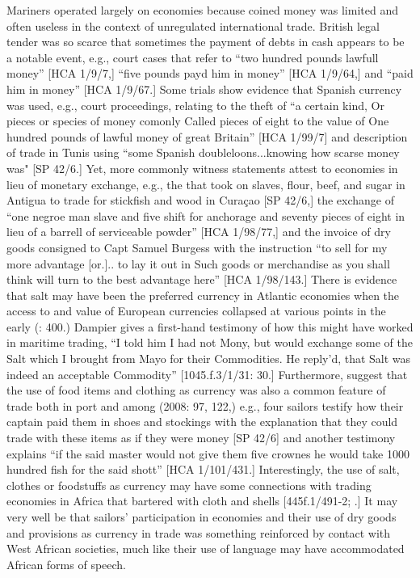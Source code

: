 Mariners operated largely on  economies because coined money was limited and often useless in the context of unregulated international trade. British legal tender was so scarce that sometimes the payment of debts in cash appears to be a notable event, e.g., court cases that refer to “two hundred pounds lawfull money” [HCA 1/9/7,] “five pounds payd him in money” [HCA 1/9/64,] and “paid him in money” [HCA 1/9/67.] Some trials show evidence that Spanish currency was used, e.g., court proceedings, relating to the theft of “a certain kind, Or pieces or species of money comonly Called pieces of eight to the value of One hundred pounds of lawful money of great Britain” [HCA 1/99/7] and description of trade in Tunis using “some Spanish doubleloons...knowing how scarse money was" [SP 42/6.] Yet, more commonly witness statements attest to  economies in lieu of monetary exchange, e.g., the  that took on slaves, flour, beef, and sugar in Antigua to trade for stickfish and wood in Curaçao [SP 42/6,] the exchange of “one negroe man slave and five shift for anchorage and seventy pieces of eight in lieu of a barrell of serviceable powder” [HCA 1/98/77,] and the invoice of dry goods consigned to Capt Samuel Burgess with the instruction “to sell for my more advantage [or.].. to lay it out in Such goods or merchandise as you shall think will turn to the best advantage here” [HCA 1/98/143.] There is evidence that salt may have been the preferred currency in Atlantic  economies when the access to and value of European currencies collapsed at various points in the early  (\citealt{Jarvis2010}: 400.) Dampier gives a first-hand testimony of how this might have worked in maritime trading, “I told him I had not Mony, but would exchange some of the Salt which I brought from Mayo for their Commodities. He reply’d, that Salt was indeed an acceptable Commodity” [1045.f.3/1/31: 30.] Furthermore, \citeauthor{AdkinsAdkins2008} suggest that the use of food items and clothing as currency was also a common feature of trade both in port and among  (2008: 97, 122,) e.g., four sailors testify how their captain paid them in shoes and stockings with the explanation that they could trade with these items as if they were money [SP 42/6] and another testimony explains “if the said master would not give them five crownes he would take 1000 hundred fish for the said shott” [HCA 1/101/431.] Interestingly, the use of salt, clothes or foodstuffs as currency may have some connections with trading economies in Africa that bartered with cloth and shells [445f.1/491-2; \citealt{HogendornJohnson2003}.] It may very well be that sailors’ participation in  economies and their use of dry goods and provisions as currency in trade was something reinforced by contact with West African societies, much like their use of language may have accommodated African forms of speech. 

